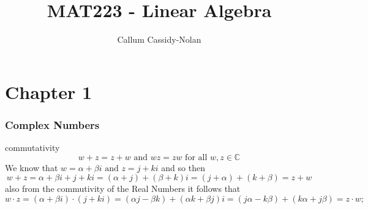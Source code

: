 \documentclass[11pt]{book}
\title{MAT223 - Linear Algebra}
\author{Callum Cassidy-Nolan}
\begin{document}
\chapter*{Chapter 1}%
\label{chp:1}

\subsection*{Complex Numbers}%
\label{sub:complex_numbers}

\begin{ver}
    commutativity
    \begin{equation*}
        w + z = z + w \text{ and } wz = zw \text{ for all } w, z \in \mathbb{C}
    \end{equation*}
    We know that $w = \alpha + \beta i  \text{ and } z = j + k i  $ and so then 
    \begin{equation*}
        w + z = \alpha + \beta i + j + k i = \left( \alpha + j \right) + \left( \beta +k \right)i = \left( j + \alpha  \right) + \left( k + \beta  \right) = z + w
    \end{equation*}
    also from the commutivity of the Real Numbers it follows that 
    \[
        w \cdot z= \left( \alpha + \beta i  \right)  \cdot \left( j + k i  \right) = \left( \alpha j  - \beta k \right)  + \left( \alpha k + \beta j \right) i= \left( j\alpha  - k\beta  \right)  + \left( k\alpha  + j\beta  \right) = z \cdot w;
    \]
    
\end{ver}
\end{document}

